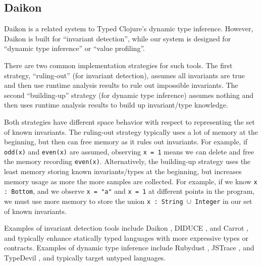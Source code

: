 \subsection{Daikon}

Daikon is a related system to Typed Clojure's dynamic type inference.
However, Daikon is built for ``invariant detection'', while our system
is designed for ``dynamic type inference'' or ``value profiling''.

There are two common implementation strategies for such tools. The first
strategy, ``ruling-out'' (for invariant detection), assumes all invariants are true 
and then use runtime analysis results to rule out
impossible invariants. The second ``building-up'' strategy (for dynamic type inference)
assumes nothing and then uses runtime analysis results to build up invariant/type knowledge.

Both strategies have different space behavior with respect to representing
the set of known invariants.
The ruling-out strategy typically uses a lot of memory at the beginning,
but then can free memory as it rules out invariants. For example, if
\texttt{odd(x)} and \texttt{even(x)} are assumed, observing \texttt{x = 1}
means we can delete and free the memory recording \texttt{even(x)}.
Alternatively, the building-up strategy uses the least memory storing
known invariants/types at the beginning, but increases memory usage
as more the more samples are collected. For example, if we know
\texttt{x : Bottom}, and we observe \texttt{x = "a"} and \texttt{x = 1}
at different points in the program, we must use more memory to
store the union \texttt{x : String $\cup$ Integer} in our set of known invariants.

Examples of invariant detection tools include Daikon \cite{Ernst06thedaikon},
DIDUCE \cite{hangal2002tracking}, and Carrot \cite{pytlik2003automated}, and
typically enhance statically typed languages with more expressive types or contracts.
Examples of dynamic type inference include Rubydust \cite{An10dynamicinference},
JSTrace \cite{saftoiu2010jstrace}, and TypeDevil \cite{pradel2015typedevil},
and typically target untyped languages.


